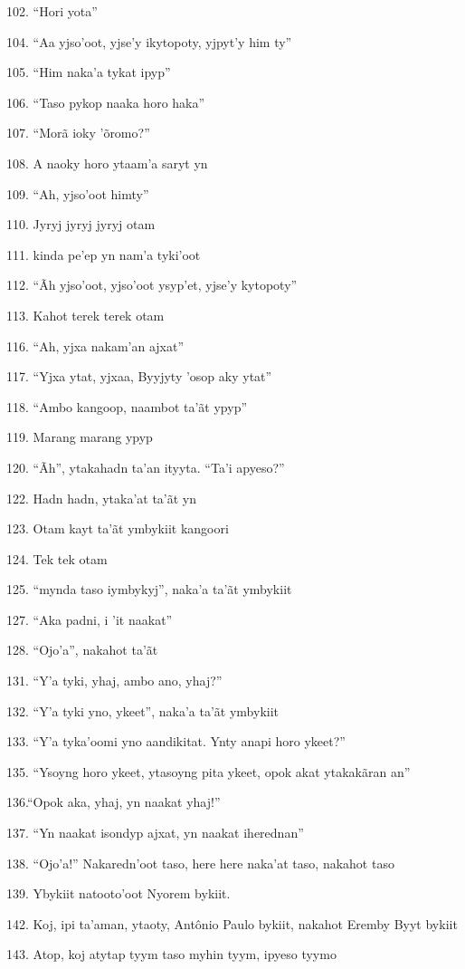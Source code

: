 102. ``Hori yota''

104. ``Aa yjso'oot, yjse'y ikytopoty, yjpyt'y him ty''

105. ``Him naka'a tykat ipyp''

106. ``Taso pykop naaka horo haka''

107. ``Morã ioky 'õromo?''

108. A naoky horo ytaam'a saryt yn

109. ``Ah, yjso'oot himty''

110. Jyryj jyryj jyryj otam

111. kinda pe'ep yn nam'a tyki'oot

112. ``Ãh yjso'oot, yjso'oot ysyp'et, yjse'y kytopoty''

113. Kahot terek terek otam

116. ``Ah, yjxa nakam'an ajxat''

117. ``Yjxa ytat, yjxaa, Byyjyty 'osop aky ytat''

118. ``Ambo kangoop, naambot ta'ãt ypyp''

119. Marang marang ypyp

120. ``Ãh'', ytakahadn ta'an ityyta. ``Ta'i apyeso?''

122. Hadn hadn, ytaka'at ta'ãt yn

123. Otam kayt ta'ãt ymbykiit kangoori

124. Tek tek otam

125. ``mynda taso iymbykyj'', naka'a ta'ãt ymbykiit

127. ``Aka padni, i 'it naakat''

128. ``Ojo'a'', nakahot ta'ãt

131. ``Y'a tyki, yhaj, ambo ano, yhaj?''

132. ``Y'a tyki yno, ykeet'', naka'a ta'ãt ymbykiit

133. ``Y'a tyka'oomi yno aandikitat. Ynty anapi horo ykeet?''

135. ``Ysoyng horo ykeet, ytasoyng pita ykeet, opok akat ytakakãran an''

136.``Opok aka, yhaj, yn naakat yhaj!''

137. ``Yn naakat isondyp ajxat, yn naakat iherednan''

138. ``Ojo'a!'' Nakaredn'oot taso, here here naka'at taso, nakahot taso

139. Ybykiit natooto'oot Nyorem bykiit.

142. Koj, ipi ta'aman, ytaoty, Antônio Paulo bykiit, nakahot Eremby Byyt bykiit

143. Atop, koj atytap tyym taso myhin tyym, ipyeso tyymo

